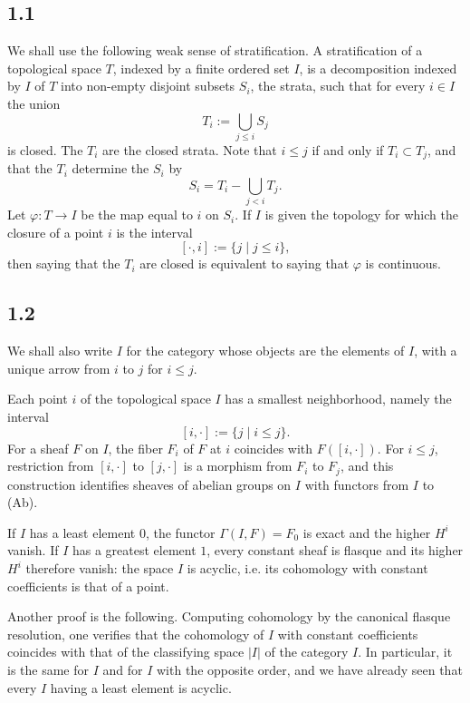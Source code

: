 \documentclass[11pt]{article}
\theoremstyle{definition}
\begin{document}
\subsection*{1.1}
We shall use the following weak sense of stratification.  A stratification of a topological space $T$, indexed by a finite ordered set $I$, is a decomposition indexed by $I$ of $T$ into non-empty disjoint subsets $S_i$, the strata, such that for every $i\in I$ the union
\[
T_i:=\bigcup_{j\leq i} S_j
\]
is closed.  The $T_i$ are the closed strata.  Note that $i\leq j$ if and only if $T_i\subset T_j$, and that the $T_i$ determine the $S_i$ by
\begin{equation}
S_i=T_i-\bigcup_{j<i}T_j.\tag{1.1.1}
\end{equation}
Let $\varphi:T\to I$ be the map equal to $i$ on $S_i$.  If $I$ is given the topology for which the closure of a point $i$ is the interval
\[
[\cdot,i]:=\{j\mid j\leq i\},
\]
then saying that the $T_i$ are closed is equivalent to saying that $\varphi$ is continuous.

\subsection*{1.2}
We shall also write $I$ for the category whose objects are the elements of $I$, with a unique arrow from $i$ to $j$ for $i\leq j$.

Each point $i$ of the topological space $I$ has a smallest neighborhood, namely the interval
\[
[i,\cdot]:=\{j\mid i\leq j\}.
\]
For a sheaf $F$ on $I$, the fiber $F_i$ of $F$ at $i$ coincides with $F([i,\cdot])$.  For $i\leq j$, restriction from $[i,\cdot]$ to $[j,\cdot]$ is a morphism from $F_i$ to $F_j$, and this construction identifies sheaves of abelian groups on $I$ with functors from $I$ to \textup{(Ab)}.

If $I$ has a least element $0$, the functor $\Gamma(I,F)=F_0$ is exact and the higher $H^i$ vanish.  If $I$ has a greatest element $1$, every constant sheaf is flasque and its higher $H^i$ therefore vanish: the space $I$ is acyclic, i.e. its cohomology with constant coefficients is that of a point.

Another proof is the following.  Computing cohomology by the canonical flasque resolution, one verifies that the cohomology of $I$ with constant coefficients coincides with that of the classifying space $|I|$ of the category $I$.  In particular, it is the same for $I$ and for $I$ with the opposite order, and we have already seen that every $I$ having a least element is acyclic.
\end{document}
